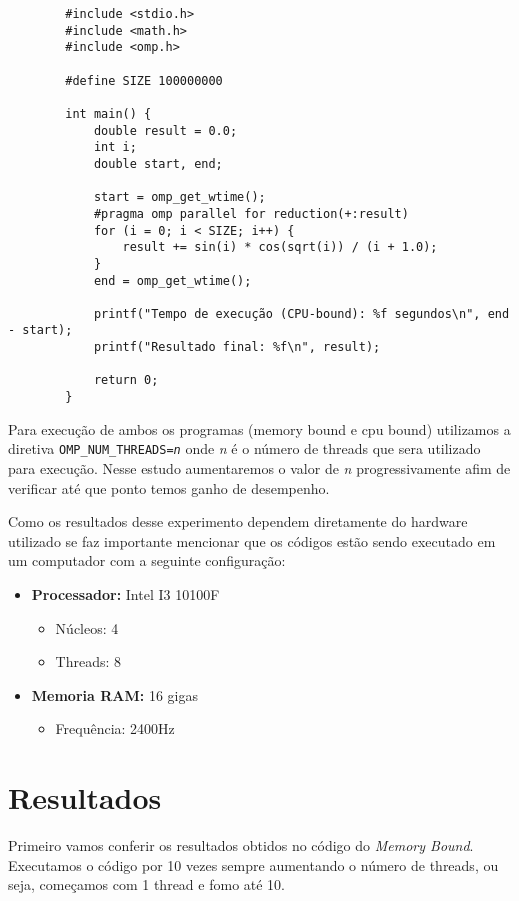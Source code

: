 \documentclass[a4paper, 12pt]{article}
\begin{document}
	\begin{verbatim}
		#include <stdio.h>
		#include <math.h>
		#include <omp.h>
		
		#define SIZE 100000000
		
		int main() {
			double result = 0.0;
			int i;
			double start, end;
			
			start = omp_get_wtime();
			#pragma omp parallel for reduction(+:result)
			for (i = 0; i < SIZE; i++) {
				result += sin(i) * cos(sqrt(i)) / (i + 1.0);
			}
			end = omp_get_wtime();
			
			printf("Tempo de execução (CPU-bound): %f segundos\n", end - start);
			printf("Resultado final: %f\n", result);
			
			return 0;
		}
	\end{verbatim}
	
		Para execução de ambos os programas (memory bound e cpu bound) utilizamos a diretiva \texttt{OMP\_NUM\_THREADS=\textit{n}} onde \textit{n} é o número de threads que sera utilizado para execução. Nesse estudo aumentaremos o valor de \textit{n} progressivamente afim de verificar até que ponto temos ganho de desempenho.
		
		Como os resultados desse experimento dependem diretamente do hardware utilizado se faz importante mencionar que os códigos estão sendo executado em um computador com a seguinte configuração:
		
		\begin{itemize}
			\item \textbf{Processador:} Intel I3 10100F 
				\begin{itemize}
					\item Núcleos: 4
					\item Threads: 8
				\end{itemize}
			\item \textbf{Memoria RAM:} 16 gigas
				\begin{itemize}
					\item Frequência: 2400Hz
				\end{itemize}	
		\end{itemize}
		
	\section{Resultados}
	
	Primeiro vamos conferir os resultados obtidos no código do \textit{Memory Bound}. Executamos o código por 10 vezes sempre aumentando o número de threads, ou seja, começamos com 1 thread e fomo até 10.
	
\end{document}
